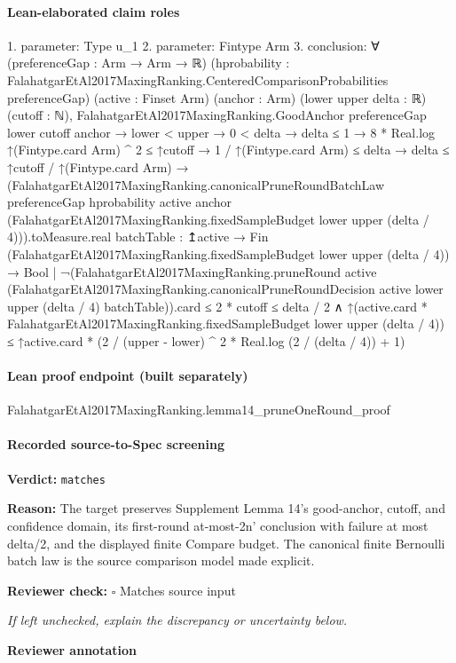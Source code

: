 \documentclass[10pt]{article}
\newcommand{\reviewerbox}{%
  \par\noindent\fbox{\parbox{0.96\linewidth}{\rule{0pt}{0.38in}}}\par
}
\newcommand{\reviewmatch}[1]{%
  \par\noindent\textbf{Reviewer check:} $\square$\; #1\par
  \noindent\emph{If left unchecked, explain the discrepancy or uncertainty below.}\par
}
\begin{document}
\paragraph{Lean-elaborated claim roles}\begin{ReviewVerbatim}
1. parameter: Type u_1
2. parameter: Fintype Arm
3. conclusion: ∀ (preferenceGap : Arm → Arm → ℝ)
  (hprobability : FalahatgarEtAl2017MaxingRanking.CenteredComparisonProbabilities preferenceGap) (active : Finset Arm)
  (anchor : Arm) (lower upper delta : ℝ) (cutoff : ℕ),
  FalahatgarEtAl2017MaxingRanking.GoodAnchor preferenceGap lower cutoff anchor →
    lower < upper →
      0 < delta →
        delta ≤ 1 →
          8 * Real.log ↑(Fintype.card Arm) ^ 2 ≤ ↑cutoff →
            1 / ↑(Fintype.card Arm) ≤ delta →
              delta ≤ ↑cutoff / ↑(Fintype.card Arm) →
                (FalahatgarEtAl2017MaxingRanking.canonicalPruneRoundBatchLaw preferenceGap hprobability active anchor
                            (FalahatgarEtAl2017MaxingRanking.fixedSampleBudget lower upper (delta / 4))).toMeasure.real
                      {batchTable :
                        ↥active →
                          Fin (FalahatgarEtAl2017MaxingRanking.fixedSampleBudget lower upper (delta / 4)) → Bool |
                        ¬(FalahatgarEtAl2017MaxingRanking.pruneRound active
                                (FalahatgarEtAl2017MaxingRanking.canonicalPruneRoundDecision active lower upper
                                  (delta / 4) batchTable)).card ≤
                            2 * cutoff} ≤
                    delta / 2 ∧
                  ↑(active.card * FalahatgarEtAl2017MaxingRanking.fixedSampleBudget lower upper (delta / 4)) ≤
                    ↑active.card * (2 / (upper - lower) ^ 2 * Real.log (2 / (delta / 4)) + 1)
\end{ReviewVerbatim}

\paragraph{Lean proof endpoint (built separately)}\begin{ReviewVerbatim}
FalahatgarEtAl2017MaxingRanking.lemma14_pruneOneRound_proof
\end{ReviewVerbatim}

\paragraph{Recorded source-to-Spec screening}
\textbf{Verdict:} \texttt{matches}
\\
{\raggedright
\textbf{Reason:} The target preserves Supplement Lemma 14's good-\allowbreak{}anchor, cutoff, and confidence domain, its first-\allowbreak{}round at-\allowbreak{}most-\allowbreak{}2n' conclusion with failure at most delta/\allowbreak{}2, and the displayed finite Compare budget.\allowbreak{} The canonical finite Bernoulli batch law is the source comparison model made explicit.\allowbreak{}
\par}
\reviewmatch{Matches source input}
\noindent\textbf{Reviewer annotation}\par
\reviewerbox
\clearpage
\hypertarget{source-claim-c9bda0a70ac78048}{}
\end{document}
